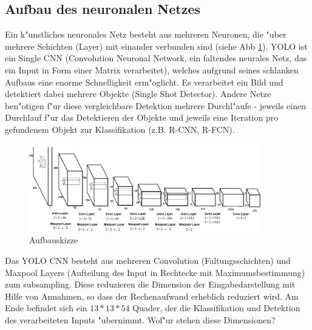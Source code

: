 \subsection{Aufbau des neuronalen Netzes}
\label{sec:cnn_aufbau}
Ein k"unstliches neuronales Netz besteht aus mehreren Neuronen, die "uber mehrere Schichten (Layer) mit einander verbunden sind (siehe Abb \ref{fig:neunet}). YOLO ist ein Single CNN (Convolution Neuronal Network, ein faltendes neurales Netz, das ein Input in Form einer Matrix verarbeitet),
welches aufgrund seines schlanken Aufbaus eine enorme Schnelligkeit erm"oglicht. Es verarbeitet ein Bild und detektiert dabei mehrere Objekte (Single Shot Detector). Andere Netze ben"otigen f"ur diese vergleichbare Detektion mehrere Durchl"aufe - jeweils einen Durchlauf f"ur das Detektieren der Objekte und jeweils eine Iteration pro gefundenem Objekt zur Klassifikation (z.B. R-CNN, R-FCN).

\begin{figure}[h]
	\centering
	\includegraphics[width=0.90\textwidth]{images/aufbauskizze}
	\caption{Aufbauskizze}
	\label{fig:neunet}
\end{figure}

Das YOLO CNN besteht aus mehreren Convolution (Faltungsschichten) und Maxpool Layers (Aufteilung des Input in Rechtecke mit Maximumsbestimmung) zum subsampling.
Diese reduzieren die Dimension der Eingabedarstellung mit Hilfe von Annahmen,
so dass der Rechenaufwand erheblich reduziert wird. Am Ende befindet sich ein $13*13*54$ Quader, der die Klassifikation und Detektion des verarbeiteten Inputs "ubernimmt. Wof"ur stehen diese Dimensionen?

